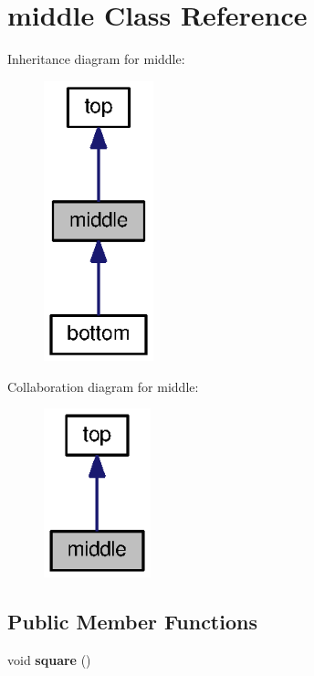 \section{middle Class Reference}
\label{classmiddle}


Inheritance diagram for middle\-:\nopagebreak
\begin{figure}[H]
\begin{center}
\leavevmode
\includegraphics[width=90pt]{classmiddle__inherit__graph}
\end{center}
\end{figure}


Collaboration diagram for middle\-:\nopagebreak
\begin{figure}[H]
\begin{center}
\leavevmode
\includegraphics[width=88pt]{classmiddle__coll__graph}
\end{center}
\end{figure}
\subsection*{Public Member Functions}
\begin{DoxyCompactItemize}
\item 
void {\bf square} ()
\end{DoxyCompactItemize}
